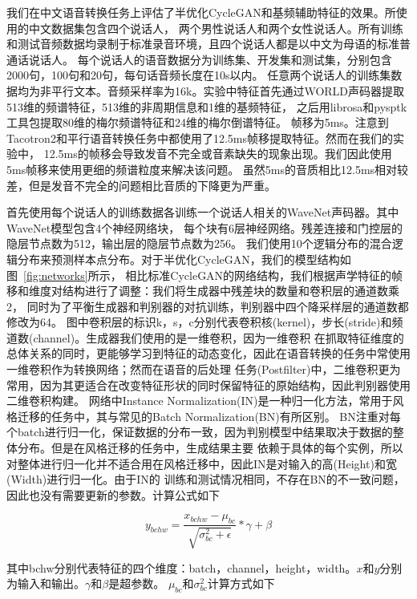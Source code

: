 我们在中文语音转换任务上评估了半优化CycleGAN和基频辅助特征的效果。所使用的中文数据集包含四个说话人，
两个男性说话人和两个女性说话人。所有训练和测试音频数据均录制于标准录音环境，且四个说话人都是以中文为母语的标准普通话说话人。
每个说话人的语音数据分为训练集、开发集和测试集，分别包含2000句，100句和20句，每句话音频长度在10s以内。
任意两个说话人的训练集数据均为非平行文本。音频采样率为16k。实验中特征首先通过WORLD声码器提取513维的频谱特征，513维的非周期信息和1维的基频特征，
之后用librosa\cite{mcfee2015librosa}和pysptk\cite{yamamoto2019r9y9}工具包提取80维的梅尔频谱特征和24维的梅尔倒谱特征。
帧移为5ms。注意到Tacotron2和平行语音转换任务中都使用了12.5ms帧移提取特征。然而在我们的实验中，
12.5ms的帧移会导致发音不完全或音素缺失的现象出现。我们因此使用5ms帧移来使用更细的频谱粒度来解决该问题。
虽然5ms的音质相比12.5ms相对较差，但是发音不完全的问题相比音质的下降更为严重。

首先使用每个说话人的训练数据各训练一个说话人相关的WaveNet声码器。其中WaveNet模型包含4个神经网络块，
每个块有6层神经网络。残差连接和门控层的隐层节点数为512，输出层的隐层节点数为256。
我们使用10个逻辑分布的混合逻辑分布来预测样本点分布。对于半优化CycleGAN，我们的模型结构如图~\ref{fig:networks}所示，
相比标准CycleGAN的网络结构，我们根据声学特征的帧移和维度对结构进行了调整：我们将生成器中残差块的数量和卷积层的通道数乘2，
同时为了平衡生成器和判别器的对抗训练，判别器中四个降采样层的通道数都修改为64。
图中卷积层的标识k，s，c分别代表卷积核(kernel)，步长(stride)和频道数(channel)。生成器我们使用的是一维卷积，因为一维卷积
在抓取特征维度的总体关系的同时，更能够学习到特征的动态变化，因此在语音转换的任务中常使用一维卷积作为转换网络；然而在语音的后处理
任务(Postfilter)中，二维卷积更为常用，因为其更适合在改变特征形状的同时保留特征的原始结构，因此判别器使用二维卷积构建。
网络中Instance Normalization(IN)是一种归一化方法，常用于风格迁移的任务中，其与常见的Batch Normalization(BN)有所区别。
BN注重对每个batch进行归一化，保证数据的分布一致，因为判别模型中结果取决于数据的整体分布。但是在风格迁移的任务中，生成结果主要
依赖于具体的每个实例，所以对整体进行归一化并不适合用在风格迁移中，因此IN是对输入的高(Height)和宽(Width)进行归一化。由于IN的
训练和测试情况相同，不存在BN的不一致问题，因此也没有需要更新的参数。计算公式如下

\begin{equation}
    y_{bchw} = \frac{x_{bchw}-\mu_{bc}}{\sqrt{\sigma^2_{bc}+\epsilon}} * \gamma + \beta
\end{equation}

其中bchw分别代表特征的四个维度：batch，channel，height，width。$x$和$y$分别为输入和输出。$\gamma$和$\beta$是超参数。
$\mu_{bc}$和$\sigma^2_{bc}$计算方式如下

